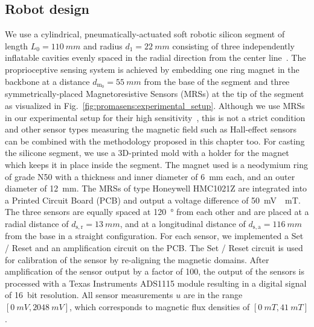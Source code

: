 \subsection{Robot design}\label{sub:promasens:robot_design}
We use a cylindrical, pneumatically-actuated soft robotic silicon segment of length $L_{0}=\SI{110}{mm}$ and radius $d_1 = \SI{22}{mm}$ consisting of three independently inflatable cavities evenly spaced in the radial direction from the center line~\citep{marchese2015recipe}. 
%
The proprioceptive sensing system is achieved by embedding one ring magnet in the backbone at a distance $d_{\mathrm{m}_0} = \SI{55}{mm}$ from the base of the segment and three symmetrically-placed Magnetoresistive Sensors (MRSs) at the tip of the segment as visualized in Fig.~\ref{fig:promasens:experimental_setup}. %
Although we use MRSs in our experimental setup for their high sensitivity~\citep{popovic2002bridging}, this is not a strict condition and other sensor types measuring the magnetic field such as Hall-effect sensors can be combined with the methodology proposed in this chapter too.
For casting the silicone segment, we use a 3D-printed mold with a holder for the magnet which keeps it in place inside the segment.
The magnet used is a neodymium ring of grade N50 with a thickness and inner diameter of \SI{6}{mm} each, and an outer diameter of \SI{12}{mm}.
%
The MRSs of type Honeywell HMC1021Z are integrated into a Printed Circuit Board (PCB) and output a voltage difference of \SI{50}{mV \per mT}. %
The three sensors are equally spaced at \SI{120}{\degree} from each other and are placed at a radial distance of $d_{\mathrm{s},\mathrm{r}} = \SI{13}{mm}$, and at a longitudinal distance of $d_{\mathrm{s},\mathrm{a}} = \SI{116}{mm}$ from the base in a straight configuration.
For each sensor, we implemented a Set / Reset and an amplification circuit on the PCB.
The Set / Reset circuit is used for calibration of the sensor by re-aligning the magnetic domains. After amplification of the sensor output by a factor of 100, the output of the sensors is processed with a Texas Instruments ADS1115 module %
resulting in a digital signal of \SI{16}{bit} resolution. All sensor measurements $u$ are in the range $[\SI{0}{mV}, \SI{2048}{mV}]$, which corresponds to magnetic flux densities of  $[\SI{0}{mT}, \SI{41}{mT}]$.

